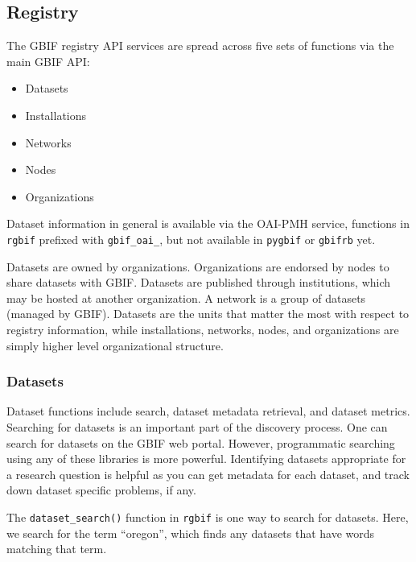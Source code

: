 \documentclass[author-year, review, 11pt]{components/elsarticle} %
\def\tightlist{}
\begin{document}
\subsection{Registry}\label{registry}

The GBIF registry API services are spread across five sets of functions
via the main GBIF API:

\begin{itemize}
\tightlist
\item
  Datasets
\item
  Installations
\item
  Networks
\item
  Nodes
\item
  Organizations
\end{itemize}

Dataset information in general is available via the OAI-PMH service,
functions in \texttt{rgbif} prefixed with \texttt{gbif\_oai\_}, but not
available in \texttt{pygbif} or \texttt{gbifrb} yet.

Datasets are owned by organizations. Organizations are endorsed by nodes
to share datasets with GBIF. Datasets are published through
institutions, which may be hosted at another organization. A network is
a group of datasets (managed by GBIF). Datasets are the units that
matter the most with respect to registry information, while
installations, networks, nodes, and organizations are simply higher
level organizational structure.

\subsubsection{Datasets}\label{datasets}

Dataset functions include search, dataset metadata retrieval, and
dataset metrics. Searching for datasets is an important part of the
discovery process. One can search for datasets on the GBIF web portal.
However, programmatic searching using any of these libraries is more
powerful. Identifying datasets appropriate for a research question is
helpful as you can get metadata for each dataset, and track down dataset
specific problems, if any.

The \texttt{dataset\_search()} function in \texttt{rgbif} is one way to
search for datasets. Here, we search for the term ``oregon'', which
finds any datasets that have words matching that term.
\end{document}
